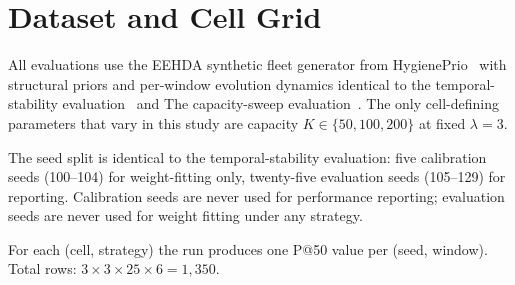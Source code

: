 \section{Dataset and Cell Grid}

All evaluations use the EEHDA synthetic fleet generator from
HygienePrio~\cite{paper4hygieneprio} with structural priors and per-window
evolution dynamics identical to the temporal-stability evaluation~\cite{paper5temporal} and
The capacity-sweep evaluation~\cite{paper6capacity}. The only cell-defining parameters that
vary in this study are capacity $K \in \{50, 100, 200\}$ at fixed
$\lambda = 3$.

The seed split is identical to the temporal-stability evaluation: five calibration seeds
(100--104) for weight-fitting only, twenty-five evaluation seeds
(105--129) for reporting. Calibration seeds are never used for
performance reporting; evaluation seeds are never used for weight
fitting under any strategy.

For each (cell, strategy) the run produces one P@50 value per (seed,
window). Total rows: $3 \times 3 \times 25 \times 6 = 1{,}350$.


